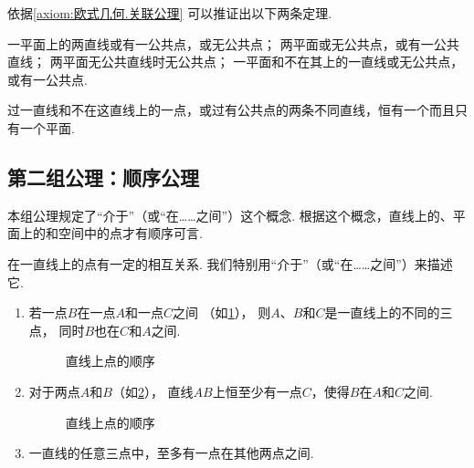 依据\cref{axiom:欧式几何.关联公理} 可以推证出以下两条定理.
\begin{theorem}\label{theorem:欧式几何.定理1}
一平面上的两直线或有一公共点，或无公共点；
两平面或无公共点，或有一公共直线；
两平面无公共直线时无公共点；
一平面和不在其上的一直线或无公共点，或有一公共点.
\end{theorem}

\begin{theorem}\label{theorem:欧式几何.定理2}
过一直线和不在这直线上的一点，或过有公共点的两条不同直线，恒有一个而且只有一个平面.
\end{theorem}

\subsection{第二组公理：顺序公理}
本组公理规定了“介于”（或“在……之间”）这个概念.
根据这个概念，直线上的、平面上的和空间中的点才有顺序可言.
\begin{axiom}[顺序公理I]\label{axiom:欧式几何.顺序公理1}
在一直线上的点有一定的相互关系.
我们特别用“介于”（或“在……之间”）来描述它.
\begin{enumerate}
	\item 若一点\(B\)在一点\(A\)和一点\(C\)之间
	（如\cref{figure:欧式几何.直线上点的顺序1}），
	则\(A\)、\(B\)和\(C\)是一直线上的不同的三点，
	同时\(B\)也在\(C\)和\(A\)之间.
	\begin{figure}[ht]
		\centering
		\caption{直线上点的顺序}
		\label{figure:欧式几何.直线上点的顺序1}
	\end{figure}

	\item 对于两点\(A\)和\(B\)（如\cref{figure:欧式几何.直线上点的顺序2}），
	直线\(AB\)上恒至少有一点\(C\)，使得\(B\)在\(A\)和\(C\)之间.
	\begin{figure}[ht]
		\centering
		\caption{直线上点的顺序}
		\label{figure:欧式几何.直线上点的顺序2}
	\end{figure}

	\item 一直线的任意三点中，至多有一点在其他两点之间.
\end{enumerate}
\end{axiom}

